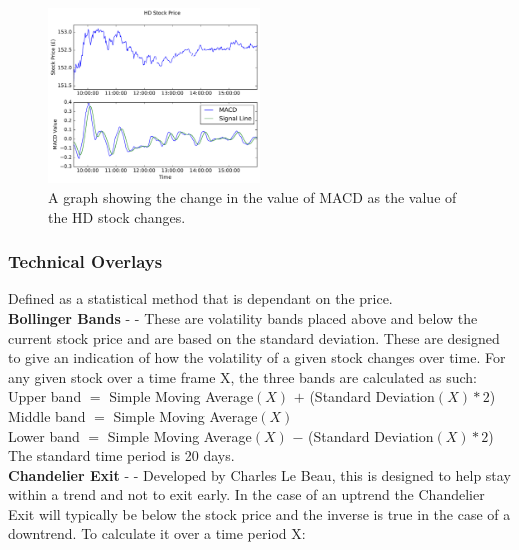 \documentclass[conference]{IEEEtran}
\begin{document}
\begin{figure}
\includegraphics[width=0.5\textwidth, angle=0]{HDDayMACD.pdf}
\caption{A graph showing the change in the value of MACD as the value of the HD stock changes.}
\label{fig:HDDayMACD}
\end{figure}

\subsubsection{Technical Overlays} Defined as a statistical method that is dependant on the price. \\

\textbf{Bollinger Bands} - \cite{Bollinger1992} - These are volatility bands placed above and below the current stock price and are based on the standard deviation. These are designed to give an indication of how the volatility of a given stock changes over time. For any given stock over a time frame X, the three bands are calculated as such:\\

\noindent
Upper band $=$ Simple Moving Average$(X)$ $+$ (Standard Deviation$(X) * 2$)\\
Middle band $=$ Simple Moving Average$(X)$\\
Lower band $=$ Simple Moving Average$(X)$ $-$ (Standard Deviation$(X) * 2$)\\
The standard time period is 20 days.\\

\noindent
\textbf{Chandelier Exit} - \cite{Elder2002} - Developed by Charles Le Beau, this is designed to help stay within a trend and not to exit early. In the case of an uptrend the Chandelier Exit will typically be below the stock price and the inverse is true in the case of a downtrend. To calculate it over a time period X:\\
\end{document}
